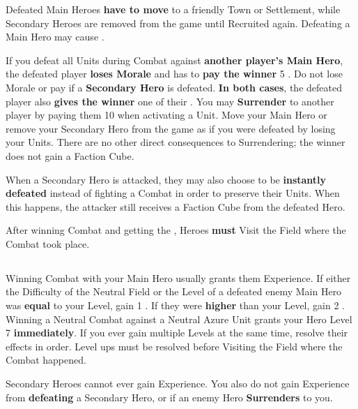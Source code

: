 \begin{multicols}{2}
Defeated Main Heroes \textbf{have to move} to a friendly Town or Settlement, while Secondary Heroes are removed from the game until Recruited again.
Defeating a Main Hero may cause .\par
If you defeat all Units during Combat against \textbf{another player's Main Hero}, the defeated player \textbf{loses Morale} and has to \textbf{pay the winner} 5 .
Do not lose Morale or pay  if a \textbf{Secondary Hero} is defeated.
\textbf{In both cases}, the defeated player also \textbf{gives the winner} one of their .
You may \textbf{Surrender} to another player by paying them 10  when activating a Unit.
Move your Main Hero or remove your Secondary Hero from the game as if you were defeated by losing your Units.
There are no other direct consequences to Surrendering; the winner does not gain a Faction Cube.\par
{}\par
When a Secondary Hero is attacked, they may also choose to be \textbf{instantly defeated} instead of fighting a Combat in order to preserve their Units.
When this happens, the attacker still receives a Faction Cube from the defeated Hero.\par
After winning Combat and getting the , Heroes \textbf{must} Visit the Field where the Combat took place.

\subsection*{}

Winning Combat with your Main Hero usually grants them Experience.
If either the Difficulty of the Neutral Field or the Level of a defeated enemy Main Hero was \textbf{equal} to your Level, gain 1 .
If they were \textbf{higher} than your Level, gain 2 .
Winning a Neutral Combat against a Neutral Azure  Unit grants your Hero Level 7 \textbf{immediately}.
If you ever gain multiple Levels at the same time, resolve their effects in order.
Level ups must be resolved before Visiting the Field where the Combat happened.\par
Secondary Heroes cannot ever gain Experience.
You also do not gain Experience from \textbf{defeating} a Secondary Hero, or if an enemy Hero \textbf{Surrenders} to you.


\end{multicols}
